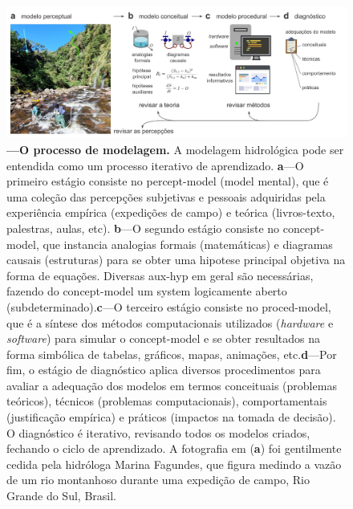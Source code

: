 \documentclass[./main.tex]{subfiles}
\begin{document}
\begin{figure}[t!] %
	\centering				
	\includegraphics[width=0.95\linewidth]{figs/fig_modelprocess.jpg}		
	\caption[O processo de modelagem]
	{\textbf{---\;O processo de modelagem.}
        A modelagem hidrológica pode ser entendida como um processo iterativo de aprendizado. \;\textbf{a}\;---\;O primeiro estágio consiste no \gls{percept-model} (\gls{model} mental), que é uma coleção das percepções subjetivas e pessoais adquiridas pela experiência empírica (expedições de campo) e teórica (livros-texto, palestras, aulas, etc). \;\textbf{b}\;---\;O segundo estágio consiste no \gls{concept-model}, que instancia analogias formais (matemáticas) e diagramas causais (estruturas) para se obter uma \gls{hipotese} principal objetiva na forma de equações. Diversas \gls{aux-hyp} em geral são necessárias, fazendo do \gls{concept-model} um \gls{system} logicamente aberto (subdeterminado).\;\textbf{c}\;---\;O terceiro estágio consiste no \gls{proced-model}, que é a síntese dos métodos computacionais utilizados (\textit{hardware} e \textit{software}) para simular o \gls{concept-model} e se obter resultados na forma simbólica de tabelas, gráficos, mapas, animações, etc.\;\textbf{d}\;---\;Por fim, o estágio de diagnóstico aplica diversos procedimentos para avaliar a adequação dos modelos em termos conceituais (problemas teóricos), técnicos (problemas computacionais), comportamentais (justificação empírica) e práticos (impactos na tomada de decisão). O diagnóstico é iterativo, revisando todos os modelos criados, fechando o ciclo de aprendizado. A fotografia em (\textbf{a}) foi gentilmente cedida pela hidróloga Marina Fagundes, que figura medindo a vazão de um rio montanhoso durante uma expedição de campo, Rio Grande do Sul, Brasil.\;
	}
\label{fig:sys:process}  %
\end{figure}
\end{document}
